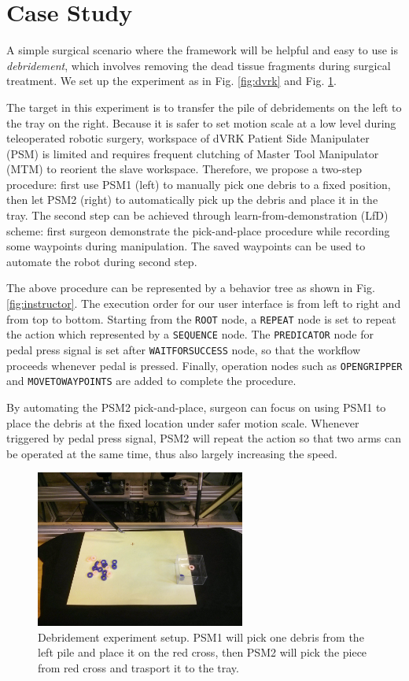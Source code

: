 \documentclass[letterpaper, 10 pt, conference]{ieeeconf}
\begin{document}
\section{Case Study}
A simple surgical scenario where the framework will be helpful and easy to use is \textit{debridement}, which involves removing the dead tissue fragments during surgical treatment. We set up the experiment as in Fig. \ref{fig:dvrk} and Fig. \ref{fig:debridement}. 

The target in this experiment is to transfer the pile of debridements  on the left to the tray on the right. Because it is safer to set motion scale at a low level during teleoperated robotic surgery, workspace of dVRK Patient Side Manipulater (PSM) is limited and requires frequent clutching of Master Tool Manipulator (MTM) to reorient the slave workspace. Therefore, we propose a two-step procedure: first use PSM1 (left) to manually pick one debris to a fixed position, then let PSM2 (right) to automatically pick up the debris and place it in the tray. The second step can be achieved through learn-from-demonstration (LfD) scheme: first surgeon demonstrate the pick-and-place procedure while recording some waypoints during manipulation. The saved waypoints can be used to automate the robot during second step. 

The above procedure can be represented by a behavior tree as shown in Fig. \ref{fig:instructor}. The execution order for our user interface is from left to right and from top to bottom. Starting from the \texttt{ROOT} node, a \texttt{REPEAT} node is set to repeat the action which represented by a \texttt{SEQUENCE} node. The \texttt{PREDICATOR} node for pedal press signal is set after \texttt{WAITFORSUCCESS} node, so that the workflow proceeds whenever pedal is pressed. Finally, operation nodes such as \texttt{OPENGRIPPER} and \texttt{MOVETOWAYPOINTS} are added to complete the procedure. 

By automating the PSM2 pick-and-place, surgeon can focus on using PSM1 to place the debris at the fixed location under safer motion scale. Whenever triggered by pedal press signal, PSM2 will repeat the action so that two arms can be operated at the same time, thus also largely increasing the speed.  


\begin{figure}[bt]
\centering
\includegraphics[width=195pt]{debridement.jpg}
\caption{Debridement experiment setup. PSM1 will pick one debris from the left pile and place it on the red cross, then PSM2 will pick the piece from red cross and trasport it to the tray.}
\label{fig:debridement}
\end{figure}
\end{document}
